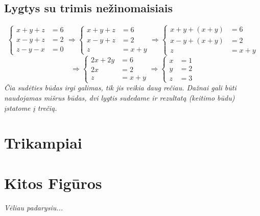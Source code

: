\documentclass[fleqn]{article} %
\begin{document}
\subsection{Lygtys su trimis nežinomaisiais}
\begin{equation}
    \begin{cases}
        x + y + z &= 6 \\
        x - y + z &= 2 \\
        z - y - x &= 0
    \end{cases}
    \Rightarrow
    \begin{cases}
        x + y + z &= 6 \\
        x - y + z &= 2 \\
        z         &= x + y
    \end{cases}
    \Rightarrow
    \begin{cases}
        x + y + (x + y) &= 6 \\
        x - y + (x + y) &= 2 \\
        z &= x + y
    \end{cases}
\end{equation}
\begin{equation}
    \Rightarrow
    \begin{cases}
        2x + 2y &= 6 \\
        2x &= 2 \\
        z &= x + y
    \end{cases}
    \Rightarrow
    \begin{cases}
        x &= 1 \\
        y &= 2 \\
        z &= 3
    \end{cases}
\end{equation}
\textit{Čia sudėties būdas irgi galimas, tik jis veikia daug rečiau. Dažnai gali būti naudojamas mišrus būdas, dvi lygtis sudedame ir rezultatą (keitimo būdu) įstatome į trečią.}

\section{Trikampiai}

% 

\section{Kitos Figūros}

\textit{Vėliau padarysiu...}
\end{document}
